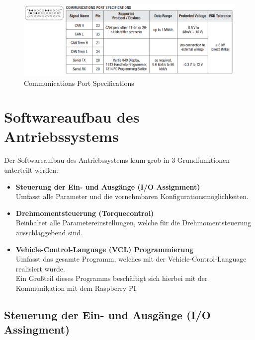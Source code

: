 \begin{figure}[H]
	\begin{center}
		\includegraphics[width=\textwidth]{figures/antrieb/Communications_Port_Specifications.png}
		\caption{Communications Port Specifications}
	\end{center}
\end{figure}



\newpage



\section{Softwareaufbau des Antriebssystems}
Der Softwareaufbau des Antriebssystems kann grob in 3 Grundfunktionen unterteilt werden:
\\[5mm]
\begin{itemize}
	\item \textbf{Steuerung der Ein- und Ausgänge (I/O Assignment)}
	\\ \medskip Umfasst alle Parameter und die vornehmbaren Konfigurationsmöglichkeiten.
	\medskip
	\item \textbf{Drehmomentsteuerung (Torquecontrol)}
	\\ \medskip Beinhaltet alle Parametereinstellungen, welche für die Drehmomentsteuerung ausschlaggebend sind.
	\medskip
	\item \textbf{Vehicle-Control-Language (VCL) Programmierung}
	\\ \medskip Umfasst das gesamte Programm, welches mit der Vehicle-Control-Language realisiert wurde.
	\\ Ein Großteil dieses Programms beschäftigt sich hierbei mit der Kommunikation mit dem Raspberry PI.
\end{itemize}

\subsection{Steuerung der Ein- und Ausgänge (I/O Assingment)}

